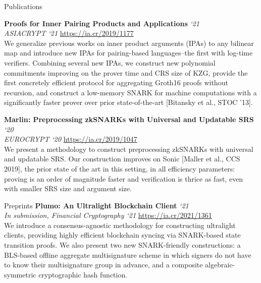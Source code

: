 \documentclass{cv}
\begin{document}
\begin{rSection}{Publications}

\textbf{Proofs for Inner Pairing Products and Applications} \hfill \emph{`21} \\
\emph{ASIACRYPT `21} \quad \url{https://ia.cr/2019/1177} \\
{\small We generalize previous works on inner product arguments (IPAs) to any bilinear map and introduce new IPAs for pairing-based languages--the first with log-time verifiers. Combining several new IPAs, we construct new polynomial commitments improving on the prover time and CRS size of KZG, provide the first concretely efficient protocol for aggregating Groth16 proofs without recursion, and construct a low-memory SNARK for machine computations with a significantly faster prover over prior state-of-the-art [Bitansky et al., STOC '13].}

\textbf{Marlin: Preprocessing zkSNARKs with Universal and Updatable SRS} \hfill \emph{`20} \\
\emph{EUROCRYPT `20} \quad \url{https://ia.cr/2019/1047} \\
{\small We present a methodology to construct preprocessing zkSNARKs with universal and updatable SRS. Our construction improves on Sonic [Maller et al., CCS 2019], the prior state of the art in this setting, in all efficiency parameters: proving is an order of magnitude faster and verification is thrice as fast, even with smaller SRS size and argument size.}

\end{rSection}

\begin{rSection}{Preprints}
\textbf{Plumo: An Ultralight Blockchain Client} \hfill \emph{`21} \\
\emph{In submission, Financial Cryptography `21} \quad \url{https://ia.cr/2021/1361} \\
{\small We introduce a consensus-agnostic methodology for constructing ultralight clients, providing highly efficient blockchain syncing via SNARK-based state transition proofs. We also present two new SNARK-friendly constructions: a BLS-based offline aggregate multisignature scheme in which signers do not have to know their multisignature group in advance, and a composite algebraic-symmetric cryptographic hash function.}
\end{rSection}
\end{document}
